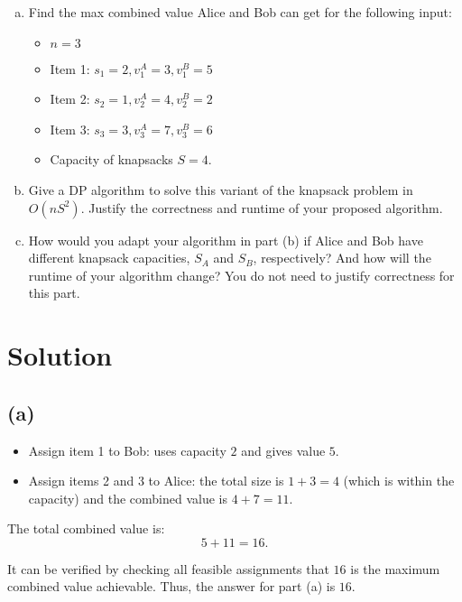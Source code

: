 \documentclass[11pt]{article}
\begin{document}
\begin{tcolorbox}[title={Problem 1 (Knapsack, Take II, 50 pts)}]
        \begin{enumerate}[(a)]
            \item Find the max combined value Alice and Bob can get for the following input:
            \begin{itemize}
                \item \( n = 3 \)
                \item Item 1: \( s_1 = 2, v_1^A = 3, v_1^B = 5 \)
                \item Item 2: \( s_2 = 1, v_2^A = 4, v_2^B = 2 \)
                \item Item 3: \( s_3 = 3, v_3^A = 7, v_3^B = 6 \)
                \item Capacity of knapsacks \(S = 4\).
            \end{itemize} 
            \item Give a DP algorithm to solve this variant of the knapsack problem in $O(nS^2)$. Justify the correctness and runtime of your proposed algorithm. 
            \item How would you adapt your algorithm in part (b) if Alice and Bob have different knapsack capacities, \(S_A\) and \(S_B\), respectively? And how will the runtime of your algorithm change? You do not need to justify correctness for this part.
        \end{enumerate}
    \end{tcolorbox}

    \section*{Solution}

    \subsection*{(a)}
    \begin{itemize}
        \item Assign item 1 to Bob: uses capacity \(2\) and gives value \(5\).
        \item Assign items 2 and 3 to Alice: the total size is \(1+3=4\) (which is within the capacity) and the combined value is \(4+7=11\).
    \end{itemize}
    The total combined value is:
    \[
    5 + 11 = 16.
    \]
    
    It can be verified by checking all feasible assignments that \(16\) is the maximum combined value achievable. Thus, the answer for part (a) is \(\boxed{16}\).
    
\end{document}
